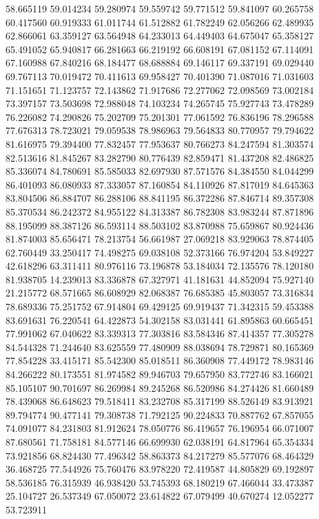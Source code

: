 58.665119
59.014234
59.280974
59.559742
59.771512
59.841097
60.265758
60.417560
60.919333
61.011744
61.512882
61.782249
62.056266
62.489935
62.866061
63.359127
63.564948
64.233013
64.449403
64.675047
65.358127
65.491052
65.940817
66.281663
66.219192
66.608191
67.081152
67.114091
67.160988
67.840216
68.184477
68.688884
69.146117
69.337191
69.029440
69.767113
70.019472
70.411613
69.958427
70.401390
71.087016
71.031603
71.151651
71.123757
72.143862
71.917686
72.277062
72.098569
73.002184
73.397157
73.503698
72.988048
74.103234
74.265745
75.927743
73.478289
76.226082
74.290826
75.202709
75.201301
77.061592
76.836196
78.296588
77.676313
78.723021
79.059538
78.986963
79.564833
80.770957
79.794622
81.616975
79.394400
77.832457
77.953637
80.766273
84.247594
81.303574
82.513616
81.845267
83.282790
80.776439
82.859471
81.437208
82.486825
85.336074
84.780691
85.585033
82.697930
87.571576
84.384550
84.044299
86.401093
86.080933
87.333057
87.160854
84.110926
87.817019
84.645363
83.804506
86.884707
86.288106
88.841195
86.372286
87.846714
89.357308
85.370534
86.242372
84.955122
84.313387
86.782308
83.983244
87.871896
88.195099
88.387126
86.593114
88.503102
83.870988
75.659867
80.924436
81.874003
85.656471
78.213754
56.661987
27.069218
83.929063
78.874405
62.760449
33.250417
74.498275
69.038108
52.373166
76.974204
53.849227
42.618296
63.311411
80.976116
73.196878
53.184034
72.135576
78.120180
81.938705
14.239013
83.336878
67.327971
41.181631
44.852094
75.927140
21.215772
68.571665
86.608929
82.068387
76.685385
45.803057
73.316834
78.689336
75.251752
67.914804
69.429125
69.919437
71.342315
59.453388
83.691631
76.220541
64.422873
54.302158
83.031441
61.895863
60.665451
77.991062
67.040622
83.339313
77.303816
83.584346
87.414357
77.305278
84.544328
71.244640
83.625559
77.480909
88.038694
78.729871
80.165369
77.854228
33.415171
85.542300
85.018511
86.360908
77.449172
78.983146
84.266222
80.173551
81.974582
89.946703
79.657950
83.772746
83.166021
85.105107
90.701697
86.269984
89.245268
86.520986
84.274426
81.660489
78.439068
86.648623
79.518411
83.232708
85.317199
88.526149
83.913921
89.794774
90.477141
79.308738
71.792125
90.224833
70.887762
67.857055
74.091077
84.231803
81.912624
78.050776
86.419657
76.196954
66.071007
87.680561
71.758181
84.577146
66.699930
62.038191
64.817964
65.354334
73.921856
68.824430
77.496342
58.863373
84.217279
85.577076
68.464329
36.468725
77.544926
75.760476
83.978220
72.419587
44.805829
69.192897
58.536185
76.315939
46.938420
53.745393
68.180219
67.466044
33.473387
25.104727
26.537349
67.050072
23.614822
67.079499
40.670274
12.052277
53.723911
